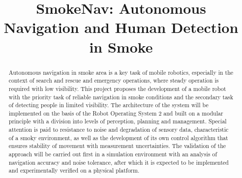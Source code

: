 \documentclass[conference]{IEEEtran}
\begin{document}
\title{SmokeNav: Autonomous Navigation and Human Detection in Smoke \\
}

\author{
\and
{}
\and
{}
\and
{}
}

\maketitle

\begin{abstract}
Autonomous navigation in smoke area is a key task of mobile robotics, especially in the context of search and rescue and emergency operations, where steady operation is required with low visibility. This project proposes the development of a mobile robot with the priority task of reliable navigation in smoke conditions and the secondary task of detecting people in limited visibility. The architecture of the system will be implemented on the basis of the Robot Operating System 2 and built on a modular principle with a division into levels of perception, planning and management. Special attention is paid to resistance to noise and degradation of sensory data, characteristic of a smoky environment, as well as the development of its own control algorithm that ensures stability of movement with measurement uncertainties. The validation of the approach will be carried out first in a simulation environment with an analysis of navigation accuracy and noise tolerance, after which it is expected to be implemented and experimentally verified on a physical platform.
\end{abstract}
\end{document}

